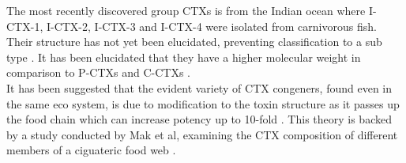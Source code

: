 The most recently discovered group CTXs is from the Indian ocean where I-CTX-1, I-CTX-2, I-CTX-3 and I-CTX-4 were isolated from carnivorous fish. Their structure has not yet been elucidated, preventing classification to a sub type \cite{hamilton2002multiple,hamilton2002isolation}. It has been elucidated that they have a higher molecular weight in comparison to P-CTXs and C-CTXs \cite{caillaud2010update,hamilton2002multiple,hamilton2002isolation}. \\ %

It has been suggested that the evident variety of CTX congeners, found even in the same eco system, is due to modification to the toxin structure as it passes up the food chain which can increase potency up to 10-fold \cite{hokama1996human,lewis2006ciguatera}. This theory is backed by a study conducted by Mak et al, examining the CTX composition of different members of a ciguateric food web \cite{mak2013pacific}.


